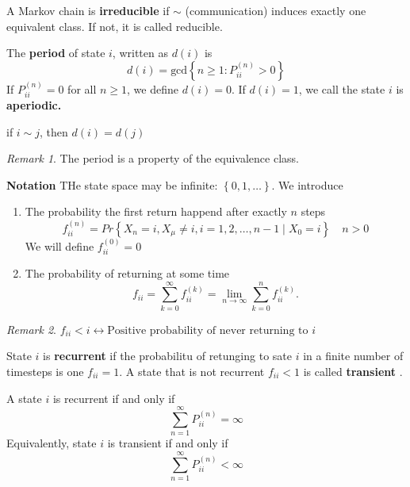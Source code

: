 \documentclass{article}
\theoremstyle{remark}
\newtheorem*{remark}{Remark}
\begin{document}
\begin{definition}
  A Markov chain is \textbf{irreducible}  if $ \sim $ (communication) induces exactly one equivalent class.  If not, it is called reducible.
\end{definition}
\begin{definition}
  The \textbf{period}  of state $i$, written as $d\left( i \right)$ is \[
  d\left( i \right) = \text{gcd}\left\{ n \ge 1: P ^{(n)} _{ii} > 0 \right\}
  \]
  If $P^{(n)} _{ii} = 0$ for all $n\ge 1$, we define $d\left( i \right) = 0$. If $d\left( i \right) = 1$, we call the state $i$ is \textbf{aperiodic.}
\end{definition}
\begin{theorem}
  if $i \sim j$, then $d\left( i \right) = d\left( j \right)$
\end{theorem}
\begin{remark}
   The period is a property of the equivalence class.
\end{remark}

\textbf{Notation} THe state space may be infinite: $\left\{ 0,1, \ldots \right\}$. We introduce
\begin{enumerate}[label=(\roman*)]
  \item The probability the first return happend after exactly $n$ steps \[
  f_{ii}^{(n)} = Pr \left \{ X_{n} = i, X_{\mu }\neq i, i  = 1,2, \ldots, n-1  \mid X_{0} = i  \right \}  \quad  n> 0
  \]
  We will define $f_{ii}^{(0)} = 0$
\item The probability of returning at some time \[
f_{ii} = \sum_{k= 0}^{\infty}  f_{ii}^{(k)} = \lim_{n \to  \infty}  \sum_{k= 0}^{n} f^{(k)} _{ii} .
\]
\end{enumerate}
 \begin{remark}
   $f_{ii} < i \leftrightarrow  \text{Positive probability of never returning to $i$}$
 \end{remark}

 \begin{definition}
   State $i$ is \textbf{recurrent}  if the probabilitu of retunging to sate $i$ in a finite number of timesteps is one $f_{ii} = 1$. A state that is not recurrent $f_{ii} < 1$ is called \textbf{transient} .
 \end{definition}

 \begin{theorem}
   A state $i$ is recurrent if and only if \[
   \sum_{n=1}^{\infty} P_{ii}^{(n)} = \infty
   \]
   Equivalently, state $i$ is transient if and only if \[
   \sum_{n=1}^{\infty}  P^{(n)}_{ii} < \infty
   \]
 \end{theorem}
\end{document}
